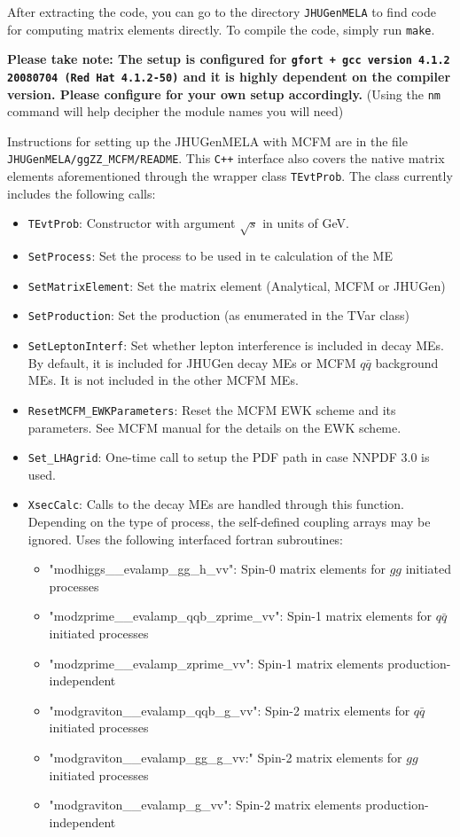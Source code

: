 \documentclass[aps,superscriptaddress,nofootinbib]{revtex4}
\begin{document}
After extracting the code, you can go to the directory \verb|JHUGenMELA| to find code for computing matrix elements directly.
To compile the code, simply run \texttt{make}.

\textbf{Please take note: The setup is configured for \texttt{gfort + gcc version 4.1.2 20080704 (Red Hat 4.1.2-50)} and it is highly dependent on the compiler version.  Please configure for your own setup accordingly.}  (Using the \verb|nm| command will help decipher the module names you will need)

Instructions for setting up the JHUGenMELA with MCFM are in the file \verb|JHUGenMELA/ggZZ_MCFM/README|. This \verb|C++| interface also covers the native matrix elements aforementioned through the wrapper class \verb|TEvtProb|. The class currently includes the following calls:
\begin{itemize}
\item \verb|TEvtProb|: Constructor with argument $\sqrt{s}$ in units of GeV.
\item \verb|SetProcess|: Set the process to be used in te calculation of the ME
\item \verb|SetMatrixElement|: Set the matrix element (Analytical, MCFM or JHUGen)
\item \verb|SetProduction|: Set the production (as enumerated in the TVar class)
\item \verb|SetLeptonInterf|: Set whether lepton interference is included in decay MEs. By default, it is included for JHUGen decay MEs or MCFM $q\bar{q}$ background MEs. It is not included in the other MCFM MEs.

\item \verb|ResetMCFM_EWKParameters|: Reset the MCFM EWK scheme and its parameters. See MCFM manual for the details on the EWK scheme.

\item \verb|Set_LHAgrid|: One-time call to setup the PDF path in case NNPDF 3.0 is used.

\item \verb|XsecCalc|: Calls to the decay MEs are handled through this function. Depending on the type of process, the self-defined coupling arrays may be ignored. Uses the following interfaced fortran subroutines:
\begin{itemize}
\item "modhiggs\_\_evalamp\_gg\_h\_vv": Spin-0 matrix elements for $gg$ initiated processes
\item "modzprime\_\_evalamp\_qqb\_zprime\_vv": Spin-1 matrix elements for $q\bar{q}$ initiated processes
\item "modzprime\_\_evalamp\_zprime\_vv": Spin-1 matrix elements production-independent
\item "modgraviton\_\_evalamp\_qqb\_g\_vv": Spin-2 matrix elements for $q\bar{q}$ initiated processes
\item "modgraviton\_\_evalamp\_gg\_g\_vv:" Spin-2 matrix elements for $gg$ initiated processes
\item "modgraviton\_\_evalamp\_g\_vv": Spin-2 matrix elements production-independent
\end{itemize}


\end{itemize}
\end{document}
